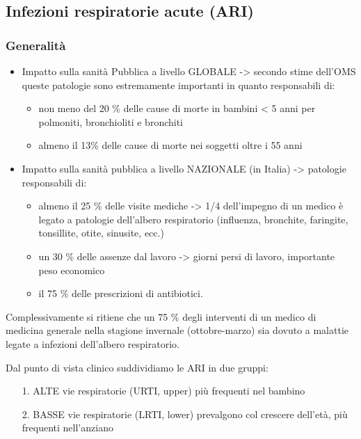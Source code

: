 \subsection{Infezioni respiratorie acute (ARI)}

\subsubsection{Generalità}
\begin{itemize}
\item Impatto sulla sanità Pubblica a livello GLOBALE -> secondo stime
  dell'OMS queste patologie sono estremamente importanti in quanto
  responsabili di:
\begin{itemize}
\item non meno del 20 \% delle cause di morte in bambini \textless{} 5
  anni per polmoniti, bronchioliti e bronchiti
\item almeno il 13\% delle cause di morte nei soggetti oltre i 55 anni
\end{itemize}
\item Impatto sulla sanità pubblica a livello NAZIONALE (in Italia) ->
  patologie responsabili di:
  \begin{itemize}
  
\item almeno il 25 \% delle visite mediche -> 1/4 dell'impegno di un medico
  è legato a patologie dell'albero respiratorio (influenza, bronchite,
  faringite, tonsillite, otite, sinusite, ecc.)
\item un 30 \% delle assenze dal lavoro -> giorni persi di lavoro,
  importante peso economico
\item il 75 \% delle prescrizioni di antibiotici.
\end{itemize}
\end{itemize}
  Complessivamente si ritiene che un 75 \% degli interventi di un medico
  di medicina generale nella stagione invernale (ottobre-marzo) sia
  dovuto a malattie legate a infezioni dell'albero respiratorio.

  Dal punto di vista clinico suddividiamo le ARI in due gruppi:
\begin{itemize}
\item[1.] ALTE vie respiratorie (URTI, upper) più frequenti nel bambino
\item[2.] BASSE vie respiratorie (LRTI, lower) prevalgono col crescere
  dell'età, più frequenti nell'anziano
\end{itemize}

